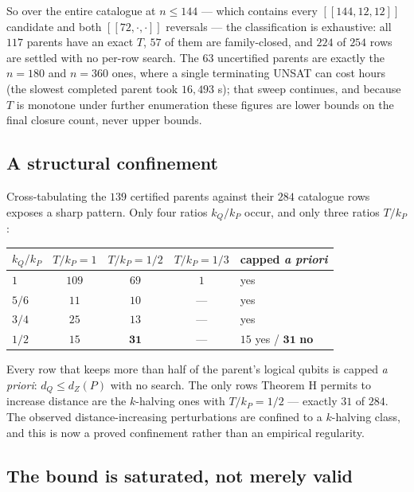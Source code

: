 \documentclass[11pt]{article}
\newcommand{\nk}[1]{[\![#1]\!]}
\theoremstyle{plain}
\theoremstyle{remark}
\begin{document}
So over the entire catalogue at $n\le 144$ --- which contains every $\nk{144,12,12}$
candidate and both $\nk{72,\cdot,\cdot}$ reversals --- the classification is exhaustive: all
$117$ parents have an exact $T$, $57$ of them are family-closed, and $224$ of $254$ rows
are settled with no per-row search. The $63$ uncertified parents are exactly the $n=180$
and $n=360$ ones, where a single terminating UNSAT can cost hours (the slowest completed
parent took $16{,}493$ s); that sweep continues, and because $T$ is monotone under further
enumeration these figures are lower bounds on the final closure count, never upper bounds.

\subsection{A structural confinement}\label{sec:confinement}

Cross-tabulating the $139$ certified parents against their $284$ catalogue rows exposes a
sharp pattern. Only four ratios $k_Q/k_P$ occur, and only three ratios $T/k_P$:

\begin{table}[ht]
\centering
\begin{tabular}{lcccl}
\toprule
$k_Q/k_P$ & $T/k_P=1$ & $T/k_P=1/2$ & $T/k_P=1/3$ & capped \emph{a priori} \\
\midrule
$1$ & $109$ & $69$ & $1$ & yes \\
$5/6$ & $11$ & $10$ & --- & yes \\
$3/4$ & $25$ & $13$ & --- & yes \\
$1/2$ & $15$ & $\mathbf{31}$ & --- & $15$ yes / $\mathbf{31}$ \textbf{no} \\
\bottomrule
\end{tabular}
\end{table}

Every row that keeps more than half of the parent's logical qubits is capped
\emph{a priori}: $d_Q\le d_Z(P)$ with no search. The only rows Theorem H permits to increase
distance are the $k$-halving ones with $T/k_P=1/2$ --- exactly $31$ of $284$. The observed
distance-increasing perturbations are confined to a $k$-halving class, and this is now a
proved confinement rather than an empirical regularity.

\subsection{The bound is saturated, not merely valid}\label{sec:saturation}
\end{document}
